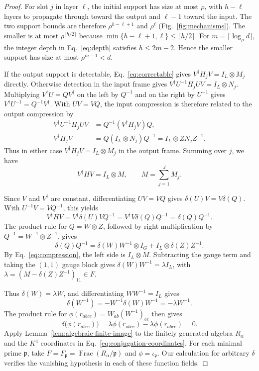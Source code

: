 \documentclass[aps,prl,reprint,notitlepage,nofootinbib,nobibnotes]{revtex4-2}
\newcommand{\id}{I}
\begin{document}
\begin{proof}
For slot \(j\) in layer \(\ell\), the initial support has size at
most \(\rho\), with \(h-\ell\) layers to propagate through toward the
output and \(\ell-1\) toward the input. The two support bounds are
therefore \(\rho^{h-\ell+1}\) and \(\rho^\ell\)
(Fig.~\ref{fig:mechanisms}). The smaller is at most
\(\rho^{\lceil h/2\rceil}\) because
\(\min\{h-\ell+1,\ell\}\le\lceil h/2\rceil\).
For \(m=\lceil\log_\rho d\rceil\), the integer depth in
Eq.~\eqref{eq:depth} satisfies \(h\le 2m-2\). Hence the smaller
support has size at most \(\rho^{m-1}<d\).

If the output support is detectable, Eq.~\eqref{eq:correctable}
gives \(V^\dagger H_jV=\id_L\otimes M_j\) directly. Otherwise detection in
the input frame gives \(V^\dagger U^{-1}H_jUV=\id_L\otimes N_j\).
Multiplying \(V^\dagger U=QV^\dagger\) on the left by \(Q^{-1}\) and on the right
by \(U^{-1}\) gives \(V^\dagger U^{-1}=Q^{-1}V^\dagger\). With \(UV=VQ\), the
input compression is therefore related to the output compression by
\begin{align*}
 V^\dagger U^{-1}H_jUV&=Q^{-1}(V^\dagger H_jV)Q,\\
 V^\dagger H_jV&=Q(\id_L\otimes N_j)Q^{-1}
       =\id_L\otimes ZN_jZ^{-1}.
\end{align*}
Thus in either case \(V^\dagger H_jV=\id_L\otimes M_j\) in the output
frame. Summing over \(j\), we have
\begin{equation}\label{eq:compression}
 V^\dagger HV=\id_L\otimes M,\qquad M=\sum_{j=1}^J M_j.
\end{equation}

Since \(V\) and \(V^\dagger\) are constant, differentiating \(UV=VQ\) gives
\(\delta(U)V=V\delta(Q)\). With \(U^{-1}V=VQ^{-1}\), this yields
\[
 V^\dagger HV=V^\dagger\delta(U)VQ^{-1}
     =V^\dagger V\delta(Q)Q^{-1}
     =\delta(Q)Q^{-1}.
\]
The product rule for \(Q=W\otimes Z\), followed by right
multiplication by \(Q^{-1}=W^{-1}\otimes Z^{-1}\), gives
\begin{equation}\label{eq:logicalgen}
 \delta(Q)Q^{-1}
   =\delta(W)W^{-1}\otimes\id_G+\id_L\otimes\delta(Z)Z^{-1}.
\end{equation}
By Eq.~\eqref{eq:compression}, the left side is \(\id_L\otimes M\).
Subtracting the gauge term and taking the \((1,1)\) gauge block
gives \(\delta(W)W^{-1}=\lambda\id_L\), with
\(\lambda=(M-\delta(Z)Z^{-1})_{11}\in F\).

Thus \(\delta(W)=\lambda W\), and differentiating \(WW^{-1}=\id_L\)
gives
\[
 \delta(W^{-1})=-W^{-1}\delta(W)W^{-1}=-\lambda W^{-1}.
\]
The product rule for \(\phi(r_{abce})=W_{ab}(W^{-1})_{ce}\) then gives
\[
 \delta\bigl(\phi(r_{abce})\bigr)
   =\lambda\phi(r_{abce})-\lambda\phi(r_{abce})=0.
\]
Apply Lemma~\ref{lem:algebraic-finite-image} to the finitely
generated algebra \(R_\alpha\) and the \(K^4\) coordinates in
Eq.~\eqref{eq:conjugation-coordinates}. For each minimal prime
\(\mathfrak p\), take \(F=F_{\mathfrak p}=\operatorname{Frac}
(R_\alpha/\mathfrak p)\) and \(\phi=\iota_{\mathfrak p}\).
Our calculation for arbitrary \(\delta\) verifies the vanishing
hypothesis in each of these function fields.


\end{proof}
\end{document}
